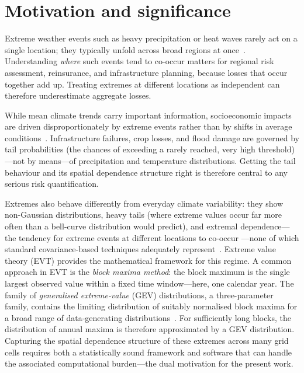 \documentclass[preprint,12pt,a4paper]{elsarticle}
\newcommand{\revg}[1]{{#1}}
\newcommand{\revt}[1]{{#1}}
\begin{document}
\section{Motivation and significance}
\label{sec:motivation}

Extreme weather events such as heavy precipitation or heat waves
rarely act on a single location; they typically unfold across broad
regions at once~\cite{davison2012}. Understanding \emph{where} such events tend to
co-occur matters for regional risk assessment, reinsurance,
and infrastructure planning, because losses that occur together add
up. Treating extremes at different locations as independent can
therefore underestimate aggregate losses.

\revg{While mean climate trends carry important information,
socioeconomic impacts are driven disproportionately by extreme events
rather than by shifts in average conditions~\cite{davison2012}. Infrastructure
failures, crop losses, and flood damage are governed by tail
probabilities (the chances of exceeding a rarely reached, very high
threshold)---not by means---of precipitation and temperature
distributions. Getting the tail behaviour and its spatial dependence
structure right is therefore central to any serious risk
quantification.}

\revg{Extremes also behave differently from everyday climate
variability: they show non-Gaussian distributions, heavy
tails (where extreme values occur far more often than a bell-curve
distribution would predict), and \revt{extremal dependence---the
tendency for extreme events at different locations to co-occur}%
---none of which standard
covariance-based techniques adequately represent~\cite{dehaan2006}. Extreme
value theory (EVT) provides the mathematical framework
for this regime. \revt{A common approach in EVT is the
\emph{block maxima method}: the block maximum is the single largest
observed value within a fixed time window---here, one calendar year.
The family of \emph{generalised extreme-value} (GEV) distributions,
a three-parameter family, contains the limiting distribution of
suitably normalised block maxima for a broad range of data-generating
distributions~\cite{dehaan2006}. For sufficiently long blocks, the
distribution of annual maxima is therefore approximated by a GEV
distribution.} Capturing the
spatial dependence structure of these extremes across many grid
cells requires both a statistically sound framework and software
that can handle the associated computational burden---the dual
motivation for the present work.}
\end{document}
